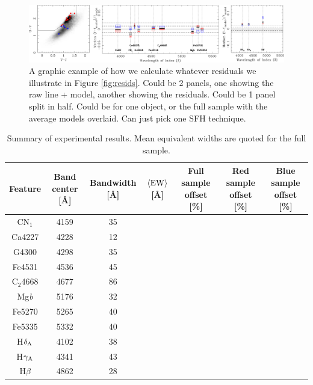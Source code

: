 \documentclass[a4paper,fleqn,usenatbib]{mnras}
\newcommand{\bfr}{\bf\color{red}}
\newcommand{\bfb}{\color{myblue}}
\begin{document}
\begin{figure}
	\includegraphics[width=\columnwidth]{residuals}
	\caption{\bfb A graphic example of how we calculate whatever residuals we illustrate
			in Figure \ref{fig:resids}. Could be 2 panels, one showing the raw line + model,
			another showing the residuals. Could be 1 panel split in half. Could be for one
			object, or the full sample with the average models overlaid. Can just pick one
			SFH technique.}
	\label{fig:metric}
\end{figure}


\begin{table}
	\centering
	\caption{Summary of experimental results. Mean equivalent widths are quoted for the full sample.}
	\label{tbl:stats}
	\begin{tabular}{ccccccc} %
		\hline
	Feature & Band center [\AA] & Bandwidth [\AA] & $\langle{\rm EW}\rangle$ [\AA] & 
	Full sample offset [\%] & {\bfr Red} sample offset [\%] & {\bfr Blue} sample offset [\%]\\
		\hline
	CN$_{1}$    & 4159 & 35\\
	Ca4227 & 4228 & 12\\
	G4300  & 4298 & 35\\
	Fe4531 & 4536 & 45\\
	C$_{2}$4668 & 4677 & 86\\
	Mg{\it b}    & 5176 & 32\\
	Fe5270 & 5265 & 40\\
	Fe5335 & 5332 & 40\\
		\hline
	H$\delta_{\rm A}$    & 4102 & 38\\
	H$\gamma_{\rm A}$    & 4341 & 43\\
	H$\beta$     & 4862 & 28\\
		\hline
	\end{tabular}
\end{table}
\end{document}
